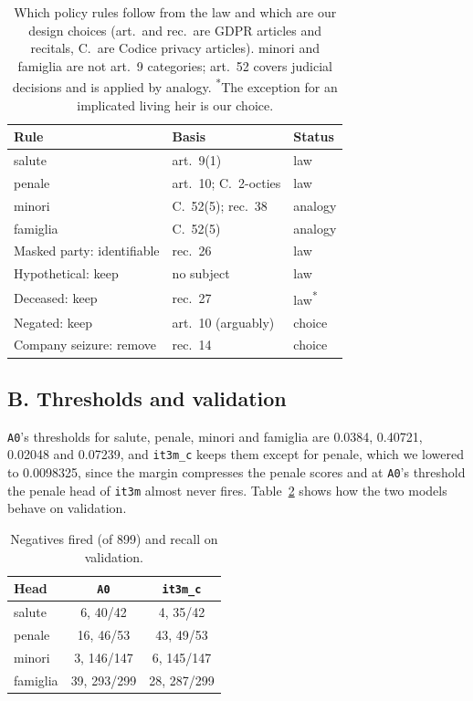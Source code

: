 \documentclass[11pt]{article}
\begin{document}
\begin{table}[t]
\centering\footnotesize
\setlength{\tabcolsep}{4pt}
\begin{tabular}{lll}
\toprule
Rule & Basis & Status \\
\midrule
salute & art.~9(1) & law \\
penale & art.~10; C.~2-octies & law \\
minori & C.~52(5); rec.~38 & analogy \\
famiglia & C.~52(5) & analogy \\
Masked party: identifiable & rec.~26 & law \\
Hypothetical: keep & no subject & law \\
Deceased: keep & rec.~27 & law\textsuperscript{*} \\
Negated: keep & art.~10 (arguably) & choice \\
Company seizure: remove & rec.~14 & choice \\
\bottomrule
\end{tabular}
\caption{Which policy rules follow from the law and which are our design choices (art.\ and rec.\ are GDPR articles and recitals, C.\ are Codice privacy articles). minori and famiglia are not art.~9 categories; art.~52 covers judicial decisions and is applied by analogy. \textsuperscript{*}The exception for an implicated living heir is our choice.}
\label{tab:policy}
\end{table}

\subsection*{B. Thresholds and validation}
\texttt{A0}'s thresholds for salute, penale, minori and famiglia are 0.0384, 0.40721, 0.02048 and 0.07239, and \texttt{it3m\_c} keeps them except for penale, which we lowered to 0.0098325, since the margin compresses the penale scores and at \texttt{A0}'s threshold the penale head of \texttt{it3m} almost never fires. Table~\ref{tab:val} shows how the two models behave on validation.

\begin{table}[t]
\centering\footnotesize
\begin{tabular}{lcc}
\toprule
Head & \texttt{A0} & \texttt{it3m\_c} \\
\midrule
salute & 6, 40/42 & 4, 35/42 \\
penale & 16, 46/53 & 43, 49/53 \\
minori & 3, 146/147 & 6, 145/147 \\
famiglia & 39, 293/299 & 28, 287/299 \\
\bottomrule
\end{tabular}
\caption{Negatives fired (of 899) and recall on validation.}
\label{tab:val}
\end{table}
\end{document}
